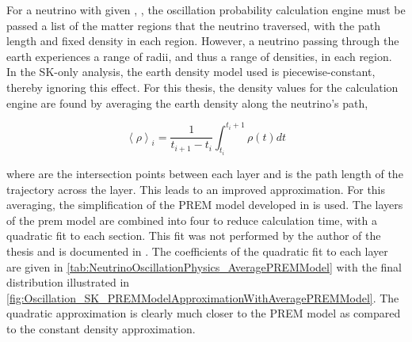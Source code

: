 For a neutrino with given , , the oscillation probability calculation engine must be passed a list of the matter regions that the neutrino traversed, with the path length and fixed density in each region. However, a neutrino passing through the earth experiences a range of radii, and thus a range of densities, in each region. In the SK-only analysis, the earth density model used is piecewise-constant, thereby ignoring this effect. For this thesis, the density values for the calculation engine are found by averaging the earth density along the neutrino's path,

\begin{equation}
  \left< \rho \right>_{i} = \frac{1}{t_{i+1}-t_{i}} \int^{t_{i}+1}_{t_{i}} \rho(t) dt
\end{equation}

where  are the intersection points between each layer and  is the path length of the trajectory across the layer. This leads to an improved approximation. For this averaging, the simplification of the PREM model developed in \cite{EarthGrav} is used. The layers of the prem model are combined into four to reduce calculation time, with a quadratic fit to each section. This fit was not performed by the author of the thesis and is documented in \cite{t2k_tn_425}. The coefficients of the quadratic fit to each layer are given in \autoref{tab:NeutrinoOscillationPhysics_AveragePREMModel} with the final distribution illustrated in \autoref{fig:Oscillation_SK_PREMModelApproximationWithAveragePREMModel}. The quadratic approximation is clearly much closer to the PREM model as compared to the constant density approximation. 




